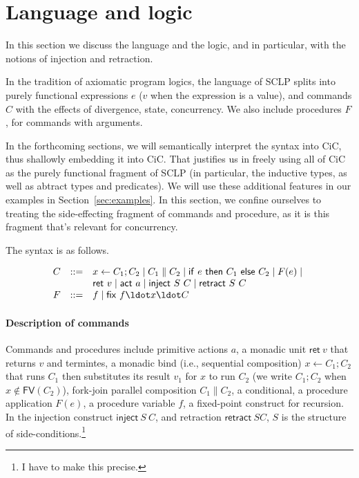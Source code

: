 \section{Language and logic}\label{sec:logic}

In this section we discuss the language and the logic, and in
particular, with the notions of injection and retraction.

In the tradition of axiomatic program logics, the language of SCLP
splits into purely functional expressions $e$ ($v$ when the expression
is a value), and commands $C$ with the effects of divergence, state,
concurrency. We also include procedures $F$, for commands with
arguments.

In the forthcoming sections, we will semantically interpret the syntax
into CiC, thus shallowly embedding it into CiC. That justifies us in
freely using all of CiC as the purely functional fragment of SCLP (in
particular, the inductive types, as well as abtract types and
predicates). We will use these additional features in our examples in
Section~\ref{sec:examples}. In this section, we confine ourselves to
treating the side-effecting fragment of commands and procedure, as it
is this fragment that's relevant for concurrency. 

The syntax is as follows. 

\[
\begin{array}{rcl}
C & ::= & x \leftarrow C_1; C_2 \mid C_1 \parallel C_2 \mid \mathsf{if}\ e\ \mathsf{then}\ C_1\ \mathsf{else}\ C_2 \mid F(e) \mid \hbox{}\\
& & \mathsf{ret}\ v \mid \mathsf{act}\ a \mid \mathsf{inject}\ S\ C \mid \mathsf{retract}\ S\ C\\
F & ::= & f \mid \mathsf{fix}\ f\ldot x\ldot C
\end{array}
\]

\paragraph{Description of commands}
Commands and procedures include primitive actions $a$, a monadic unit
$\mathsf{ret}\ v$ that returns $v$ and termintes, a monadic bind
(i.e., sequential composition) $x \leftarrow C_1; C_2$ that runs $C_1$
then substitutes its result $v_1$ for $x$ to run $C_2$ (we write $C_1;
C_2$ when $x \not\in \mathsf{FV}(C_2)$), fork-join parallel
composition $C_1 \parallel C_2$, a conditional, a procedure
application $F(e)$, a procedure variable $f$, a fixed-point construct
for recursion. In the injection construct $\mathsf{inject}\ S\ C$, and
retraction $\mathsf{retract}\ S C$, $S$ is the structure of
side-conditions.\footnote{I have to make this precise.}


